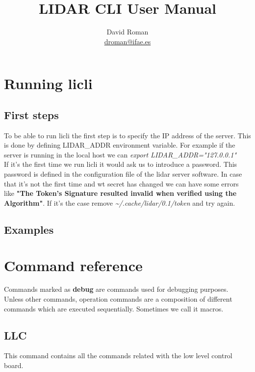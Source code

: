 \documentclass[letterpaper, 10 pt]{article}
\begin{document}
\title{LIDAR CLI User Manual}
\author{David Roman \\  \href{mailto:droman@ifae.es}{droman@ifae.es} }
\maketitle
\pagestyle{empty}
\newpage
\tableofcontents
\newpage
{}
\pagestyle{plain}

\section{Running licli}
\subsection{First steps}
To be able to run licli the first step is to specify the IP address of the server. This is done by defining LIDAR\_ADDR environment variable. For example if the server is running in the local host we can \emph{export LIDAR\_ADDR="127.0.0.1"}\\
\linebreak
If it's the first time we run licli it would ask us to introduce a password. This password is defined in the configuration file of the lidar server software. 
In case that it's not the first time and wt secret has changed we can have some errors like \textbf{"The Token's Signature resulted invalid when verified using the Algorithm"}. If it's the case remove \textit{\~{}/.cache/lidar/0.1/token} and try again.\\
\subsection{Examples}

\section{Command reference}
Commands marked as \textbf{debug} are commands used for debugging purposes.\\
\linebreak
Unless other commands, operation commands are a composition of different commands which are executed sequentially. Sometimes we call it macros.
\subsection{LLC}
This command contains all the commands related with the low level control board.
\end{document}

